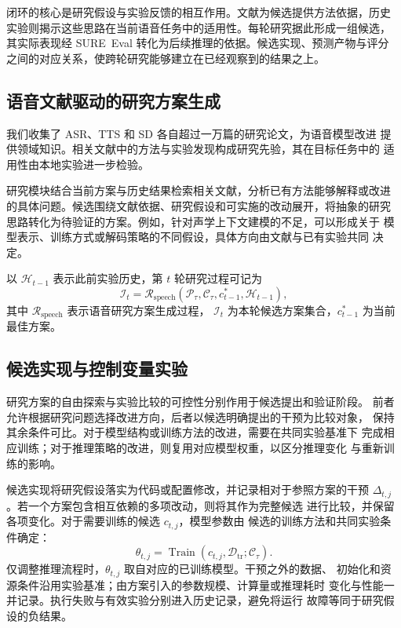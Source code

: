 \documentclass{article}
\begin{document}
闭环的核心是研究假设与实验反馈的相互作用。文献为候选提供方法依据，历史
实验则揭示这些思路在当前语音任务中的适用性。每轮研究据此形成一组候选，
其实际表现经 SURE~Eval 转化为后续推理的依据。候选实现、预测产物与评分
之间的对应关系，使跨轮研究能够建立在已经观察到的结果之上。

\subsection{语音文献驱动的研究方案生成}

我们收集了 ASR、TTS 和 SD 各自超过一万篇的研究论文，为语音模型改进
提供领域知识。相关文献中的方法与实验发现构成研究先验，其在目标任务中的
适用性由本地实验进一步检验。

研究模块结合当前方案与历史结果检索相关文献，分析已有方法能够解释或改进
的具体问题。候选围绕文献依据、研究假设和可实施的改动展开，将抽象的研究
思路转化为待验证的方案。例如，针对声学上下文建模的不足，可以形成关于
模型表示、训练方式或解码策略的不同假设，具体方向由文献与已有实验共同
决定。

以 $\mathcal{H}_{t-1}$ 表示此前实验历史，第 $t$ 轮研究过程可记为
\begin{equation}
\mathcal{I}_t=\mathcal{R}_{\mathrm{speech}}
 (\mathcal{P}_{\tau},\mathcal{C}_{\tau},c^*_{t-1},\mathcal{H}_{t-1}),
\end{equation}
其中 $\mathcal{R}_{\mathrm{speech}}$ 表示语音研究方案生成过程，
$\mathcal{I}_t$ 为本轮候选方案集合，$c^*_{t-1}$ 为当前最佳方案。

\subsection{候选实现与控制变量实验}

研究方案的自由探索与实验比较的可控性分别作用于候选提出和验证阶段。
前者允许根据研究问题选择改进方向，后者以候选明确提出的干预为比较对象，
保持其余条件可比。对于模型结构或训练方法的改进，需要在共同实验基准下
完成相应训练；对于推理策略的改进，则复用对应模型权重，以区分推理变化
与重新训练的影响。

候选实现将研究假设落实为代码或配置修改，并记录相对于参照方案的干预
$\Delta_{t,j}$。若一个方案包含相互依赖的多项改动，则将其作为完整候选
进行比较，并保留各项变化。对于需要训练的候选 $c_{t,j}$，模型参数由
候选的训练方法和共同实验条件确定：
\begin{equation}
\theta_{t,j}=\operatorname{Train}
 (c_{t,j},\mathcal{D}_{\mathrm{tr}};\mathcal{C}_{\tau}).
\end{equation}
仅调整推理流程时，$\theta_{t,j}$ 取自对应的已训练模型。干预之外的数据、
初始化和资源条件沿用实验基准；由方案引入的参数规模、计算量或推理耗时
变化与性能一并记录。执行失败与有效实验分别进入历史记录，避免将运行
故障等同于研究假设的负结果。
\end{document}
